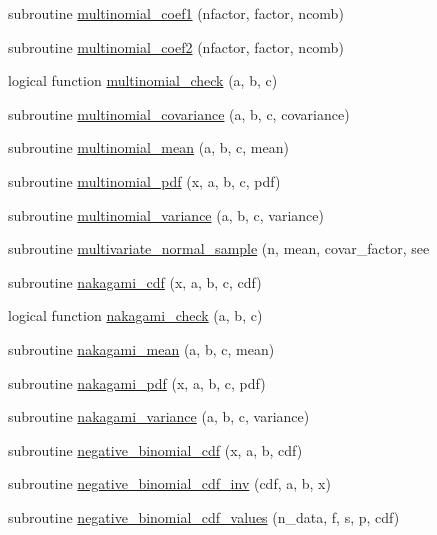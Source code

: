 \begin{DoxyCompactItemize}
\item 
subroutine \hyperlink{subroutines_8f_a46d0e2c4bd77aa17906a0c078644ef70}{multinomial\+\_\+coef1} (nfactor, factor, ncomb)
\item 
subroutine \hyperlink{subroutines_8f_af3777109b98aa6fc4f03f4addf3aa25a}{multinomial\+\_\+coef2} (nfactor, factor, ncomb)
\item 
logical function \hyperlink{subroutines_8f_a08d328387eca875e6e4607272e11686d}{multinomial\+\_\+check} (a, b, c)
\item 
subroutine \hyperlink{subroutines_8f_a2b11f65f62b24b99045c300950f4339f}{multinomial\+\_\+covariance} (a, b, c, covariance)
\item 
subroutine \hyperlink{subroutines_8f_a57b18d442553cc6c6246577d0d12c251}{multinomial\+\_\+mean} (a, b, c, mean)
\item 
subroutine \hyperlink{subroutines_8f_ac791e27becddd5cfe53d1062d309de3e}{multinomial\+\_\+pdf} (x, a, b, c, pdf)
\item 
subroutine \hyperlink{subroutines_8f_ac6f2948192704b125520724b222c4b17}{multinomial\+\_\+variance} (a, b, c, variance)
\item 
subroutine \hyperlink{subroutines_8f_a43438adca45037973084c5532ff74f9c}{multivariate\+\_\+normal\+\_\+sample} (n, mean, covar\+\_\+factor, see
\item 
subroutine \hyperlink{subroutines_8f_a7d1c9c829d46e6a08ac16ecdcd892ba2}{nakagami\+\_\+cdf} (x, a, b, c, cdf)
\item 
logical function \hyperlink{subroutines_8f_a0fc1a001333a912cdbb380678a85684f}{nakagami\+\_\+check} (a, b, c)
\item 
subroutine \hyperlink{subroutines_8f_af6cbe23e0a51a71de05f4203757b4191}{nakagami\+\_\+mean} (a, b, c, mean)
\item 
subroutine \hyperlink{subroutines_8f_ac2b735b8833a1f49afea86005e5195a8}{nakagami\+\_\+pdf} (x, a, b, c, pdf)
\item 
subroutine \hyperlink{subroutines_8f_a3aa3d66f708fc79f64059739e68629c5}{nakagami\+\_\+variance} (a, b, c, variance)
\item 
subroutine \hyperlink{subroutines_8f_ad671c9a9b8c8f32ec2e8127553c61871}{negative\+\_\+binomial\+\_\+cdf} (x, a, b, cdf)
\item 
subroutine \hyperlink{subroutines_8f_ae12eccbe6c772587d80a92ff74f1d15e}{negative\+\_\+binomial\+\_\+cdf\+\_\+inv} (cdf, a, b, x)
\item 
subroutine \hyperlink{subroutines_8f_ae188cd5921ebcfa4e2b83130bba6f0e7}{negative\+\_\+binomial\+\_\+cdf\+\_\+values} (n\+\_\+data, f, s, p, cdf)

\end{DoxyCompactItemize}
